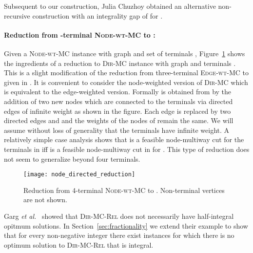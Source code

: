 \documentclass[11pt]{article}
\newcommand{\etal}{{\em et al.}~}
\def\MC{\textsc{Edge-wt-MC}\xspace}
\def\DirMC{\textsc{Dir-MC}\xspace}
\def\2DirMC{\text{-Bi-Cut}\xspace}
\def\NodeMC{\textsc{Node-wt-MC}\xspace}
\def\DirMCRel{\textsc{Dir-MC-Rel}\xspace}
\def\NodeMC{\textsc{Node-wt-MC}\xspace}
\begin{document}
Subsequent to our construction, Julia Chuzhoy obtained
an alternative non-recursive construction with an integrality gap of
 for \2DirMC. 

\paragraph{Reduction from -terminal \NodeMC to \2DirMC:} 
Given a \NodeMC instance with graph  and set of terminals
, Figure~\ref{fig:node_to_directed_reduction}
shows the ingredients of a reduction to \DirMC instance with graph
 and terminals . This is a slight modification of the
reduction from three-terminal \MC to \2DirMC given in \cite{GargVY04}.
It is convenient to consider the node-weighted
version of \DirMC which is equivalent to the edge-weighted version.
Formally  is obtained from  by the addition of two new nodes
 which are connected to the terminals via directed edges of
infinite weight as shown in the figure. Each edge  is
replaced by two directed edges  and  and the weights of
the nodes of  remain the same. We will assume without loss of generality
that the terminals  have infinite weight.
A relatively simple case analysis shows that 
 is a feasible node-multiway cut for the terminals
 in  iff  is a feasible node-multiway cut in 
 for . This type of reduction does not seem to generalize
beyond four terminals.

\iffalse
Given a \NodeMC instance with graph  and set of terminals
, figure \ref{fig:node_to_directed_reduction}
shows a reduction to \DirMC instance with graph  and terminals
. For each non-terminal vertex  in , we have two
terminals  and an edge  with weight . For
each edge  we have two new edges  and
 of infinite weight. We also have two new vertices 
and edges:
. Weights
of all of these edges are infinite. It is easy to argue that  is a
feasible solution to \MC in G iff  is a
feasible solution to \NodeMC in . Infinite weight edges are never
picked in optimum solution for \NodeMC. Thus, minimum cut for \MC in
 is of same value as the minimum cut for \NodeMC in .
\fi

\begin{figure}[htb]
\centering
\texttt{[image: node\_directed\_reduction]}
\caption{Reduction from 4-terminal \NodeMC to \2DirMC. Non-terminal
vertices are not shown.}
\label{fig:node_to_directed_reduction}
\end{figure}

Garg \etal \cite{GargVY04} showed that \DirMCRel does not necessarily
have half-integral opitmum solutions. In
Section~\ref{sec:fractionality} we extend their example to show that
for every non-negative integer  there exist instances for which 
there is no optimum solution to \DirMCRel that is  integral.
\end{document}
